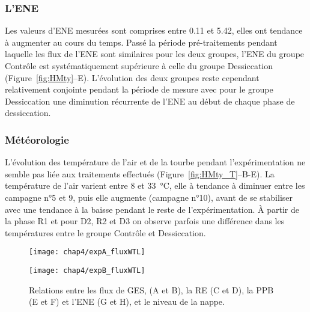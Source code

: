 \subsubsection{L'ENE}

Les valeurs d'ENE mesurées sont comprises entre \num{0.11} et \SI{5.42}{\uml}, elles ont tendance à augmenter au cours du temps.
Passé la période pré-traitements pendant laquelle les flux de l'ENE sont similaires pour les deux groupes, l'ENE du groupe Contrôle est systématiquement supérieure à celle du groupe Dessiccation (Figure~\ref{fig:HMty}--E).
L'évolution des deux groupes reste cependant relativement conjointe pendant la période de mesure avec pour le groupe Dessiccation une diminution récurrente de l'ENE au début de chaque phase de dessiccation.

\subsubsection{Météorologie}

L'évolution des température de l'air et de la tourbe pendant l'expérimentation ne semble pas liée aux traitements effectués (Figure~\ref{fig:HMty_T}--B-E).
La température de l'air varient entre 8 et \SI{33}{\degreeCelsius}, elle à tendance à diminuer entre les campagne n°5 et 9, puis elle augmente (campagne n°10), avant de se stabiliser avec une tendance à la baisse pendant le reste de l'expérimentation.
À partir de la phase R1 et pour D2, R2 et D3 on observe parfois une différence dans les températures entre le groupe Contrôle et Dessiccation.


\begin{figure}
\centering
\begin{minipage}{.5\textwidth}
\centering
\texttt{[image: chap4/expA\_fluxWTL]}
\end{minipage}%
\begin{minipage}{.5\textwidth}
\centering
\texttt{[image: chap4/expB\_fluxWTL]}
\end{minipage}%
\caption{Relations entre les flux de GES, \chh (A et B), la RE (C et D), la PPB (E et F) et l'ENE (G et H), et le niveau de la nappe.}
\label{fig:hm_wtl}
\end{figure}

